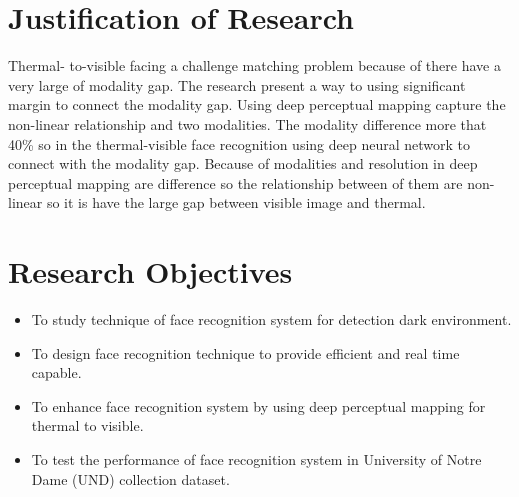 \documentclass[a4paper, 12pt]{article}
\begin{document}
\section{Justification of Research} 

Thermal- to-visible facing a challenge matching problem because of there have a very large of modality gap. The research present a way to using significant margin to connect the modality gap. Using deep perceptual mapping capture the non-linear relationship and two modalities. The modality difference more that 40\% so in the thermal-visible face recognition using deep neural network to connect with the modality gap. Because of modalities and resolution in deep perceptual mapping are difference so the relationship between of them are non-linear so it is have the large gap between visible image and thermal.

\section{Research Objectives}

\begin{itemize}
  \item To study technique of face recognition system for detection dark environment.
  \item To design face recognition technique to provide efficient and real time capable.
  \item To enhance face recognition system by using deep perceptual mapping for thermal to visible.
  \item To test the performance of face recognition system in University of Notre Dame (UND) collection dataset.
\end{itemize}
\end{document}
